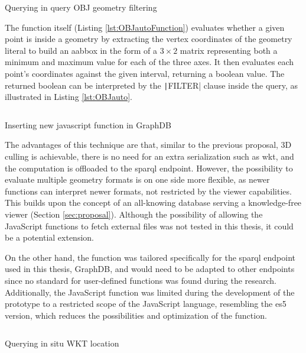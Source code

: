 \begin{listing}[H]
    \inputminted{sparql}{dynamicQueries/inQuery/query.rq}
    \vspace{-0.7cm}
    \caption{Querying in query OBJ geometry filtering}
    \label{lst:OBJauto}
\end{listing}

The function itself (Listing \ref{lst:OBJautoFunction}) evaluates whether a given point is inside a geometry by extracting the vertex coordinates of the geometry literal to build an \ac{aabbox} in the form of a $3\times2$ matrix representing both a minimum and maximum value for each of the three axes. It then evaluates each point's coordinates against the given interval, returning a boolean value. The returned boolean can be interpreted by the \texttt|FILTER| clause inside the query, as illustrated in Listing \ref{lst:OBJauto}.

\begin{listing}[H]
    \inputminted{sparql}{dynamicQueries/inQuery/insert.rq}
    \vspace{-0.7cm}
    \caption{Inserting new javascript function in GraphDB}
    \label{lst:graphdbNewFunction}
\end{listing}

The advantages of this technique are that, similar to the previous proposal, 3D culling is achievable, there is no need for an extra serialization such as \ac{wkt}, and the computation is offloaded to the \ac{sparql} endpoint. However, the possibility to evaluate multiple geometry formats is on one side more flexible, as newer functions can interpret newer formats, not restricted by the viewer capabilities. This builds upon the concept of an all-knowing database serving a knowledge-free viewer (Section \ref{sec:proposal}). Although the possibility of allowing the JavaScript functions to fetch external files was not tested in this thesis, it could be a potential extension.

On the other hand, the function was tailored specifically for the \ac{sparql} endpoint used in this thesis, GraphDB, and would need to be adapted to other endpoints since no standard for user-defined functions was found during the research. Additionally, the JavaScript function was limited during the development of the prototype to a restricted scope of the JavaScript language, resembling the \ac{es5} version, which reduces the possibilities and optimization of the function.
\begin{listing}[H]
    \inputminted{js}{dynamicQueries/inQuery/function.js}
    \vspace{-0.7cm}
    \caption{Querying in situ WKT location}
    \label{lst:OBJautoFunction}
\end{listing}

